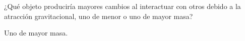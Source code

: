 ¿Qué objeto produciría mayores cambios al interactuar con otros debido a la atracción gravitacional, uno de menor o uno de mayor masa?


\begin{solutionbox}{2cm}
    Uno de mayor masa.
\end{solutionbox}
